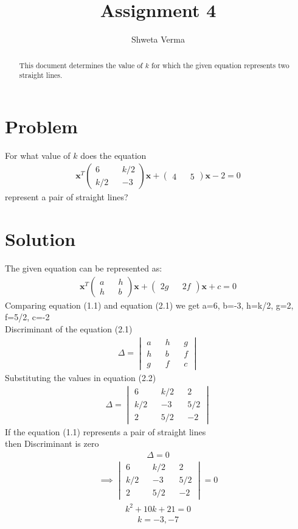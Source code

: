 \documentclass[journal,13pt,twocolumn]{IEEEtran}
\newcommand{\myvec}[1]{\ensuremath{\begin{pmatrix}#1\end{pmatrix}}}
\newcommand{\mydet}[1]{\ensuremath{\begin{vmatrix}#1\end{vmatrix}}}
\renewcommand{\vec}[1]{\mathbf{#1}}
\begin{document}
\title{Assignment 4} 
\author{Shweta Verma} 
\maketitle
\newpage
\bigskip
\begin{abstract}
This document determines the value of $k$ for which the given equation represents two straight lines.
\end{abstract}
\section{\textbf{Problem}}
For what value of $k$ does the equation 
\begin{align}
\vec{x}^T \myvec{6 && k/2 \\ k/2 && -3} \vec{x} + \myvec{4 && 5}\vec{x} -2 = 0
\end{align}
represent a pair of straight lines?
\section{\textbf{Solution}}
The given equation can be represented as:
\begin{align}
\vec{x}^T \myvec{a && h \\ h && b} \vec{x} + \myvec{2g && 2f}\vec{x} +c = 0
\end{align}
Comparing equation (1.1) and equation (2.1) we get
a=6, b=-3, h=k/2, g=2, f=5/2, c=-2\\
Discriminant of the equation (2.1)
\begin{align}
\Delta = \mydet{a && h && g\\ h && b && f\\ g && f && c}
\end{align}
Substituting the values in equation (2.2)
\begin{align}
\Delta = \mydet{6 && k/2 && 2\\ k/2 && -3 && 5/2\\2 && 5/2 && -2}
\end{align}
If the equation (1.1) represents a pair of straight lines\\
then Discriminant is zero
\begin{align}
\Delta = 0
\end{align}
\begin{align}
\implies \mydet{6 && k/2 && 2\\ k/2 && -3 && 5/2\\2 && 5/2 && -2} = 0
\end{align}
\begin{align}
k^2 + 10k + 21 = 0
\end{align}
\begin{align}
k = -3,-7
\end{align}
\end{document}
